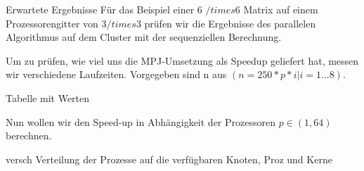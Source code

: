 \documentclass[
ngerman,
subtask=ruled %
]{tudaexercise}
\begin{document}
	\begin{task} {Erwartete Ergebnisse}
		Für das Beispiel einer 6 $/times$6 Matrix auf einem Prozessorengitter von 3$/times$3 prüfen wir die Ergebnisse des parallelen Algorithmus auf dem Cluster mit der sequenziellen Berechnung.
		
		Um zu prüfen, wie viel uns die MPJ-Umsetzung als Speedup geliefert hat, messen wir verschiedene Laufzeiten.
		Vorgegeben sind n aus $(n = 250 * p * i | i=1...8)$.
		
		Tabelle mit Werten
		
		Nun wollen wir den Speed-up in Abhängigkeit der Prozessoren $p \in (1, 64)$ berechnen.
		
		versch Verteilung der Prozesse auf die verfügbaren Knoten, Proz und Kerne
	\end{task}


	\appendix
\end{document}
